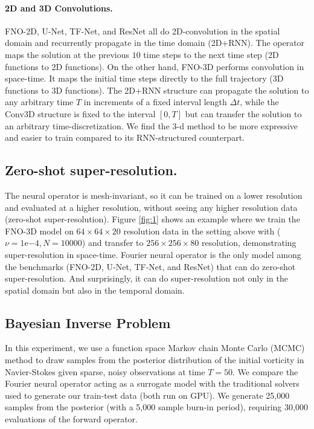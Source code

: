 \documentclass{article} %
\newcommand{\zongyi}[1]{\textcolor{green}{{\bf Zongyi:}  #1}}
\begin{document}
\paragraph{2D and 3D Convolutions.}
FNO-2D, U-Net, TF-Net, and ResNet all do 2D-convolution in the spatial domain and recurrently propagate in the time domain (2D+RNN). The operator maps the solution at the previous $10$ time steps to the next time step (2D functions to 2D functions). On the other hand, FNO-3D performs convolution in space-time. It maps the initial time steps directly to the full trajectory (3D functions to 3D functions).
The 2D+RNN structure can propagate the solution to any arbitrary time $T$ in increments of a fixed interval length $\Delta t$, while the Conv3D structure is fixed to the interval $[0, T]$ but can transfer the solution to an arbitrary time-discretization. We find the 3-d  method to be more expressive and easier to train compared to its RNN-structured counterpart.  


\subsection{Zero-shot super-resolution.}
\label{sec:superresolution}
The neural operator is mesh-invariant, so it can be trained on a lower resolution and evaluated at a higher resolution, without seeing any higher resolution data (zero-shot super-resolution).
Figure \ref{fig:1} shows an example where we train the FNO-3D model on $64 \times 64 \times 20$ resolution data in the setting above with ($\nu=1\mathrm{e}{-4}, N=10000$) and transfer to $256 \times 256 \times 80$ resolution, demonstrating super-resolution in space-time. Fourier neural operator is the only model among the benchmarks (FNO-2D, U-Net, TF-Net, and ResNet) that can do zero-shot super-resolution. And surprisingly, it can do super-resolution not only in the spatial domain but also in the temporal domain.




\subsection{Bayesian Inverse Problem}
\label{sec:bayesian}
In this experiment, we use a function space Markov chain Monte Carlo (MCMC) method \citep{Cotter_2013} to draw samples from the posterior distribution of the initial vorticity in Navier-Stokes given sparse, noisy observations at time $T=50$. We compare the Fourier neural operator acting as a surrogate model with the traditional solvers used to generate our train-test data (both run on GPU). We generate 25,000 samples from the posterior (with a 5,000 sample burn-in period), requiring 30,000 evaluations of the forward operator.
\end{document}
